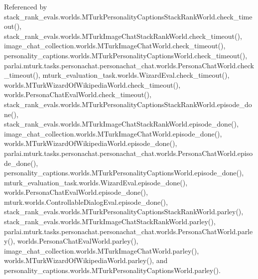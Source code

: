 Referenced by stack\+\_\+rank\+\_\+evals.\+worlds.\+M\+Turk\+Personality\+Captions\+Stack\+Rank\+World.\+check\+\_\+timeout(), stack\+\_\+rank\+\_\+evals.\+worlds.\+M\+Turk\+Image\+Chat\+Stack\+Rank\+World.\+check\+\_\+timeout(), image\+\_\+chat\+\_\+collection.\+worlds.\+M\+Turk\+Image\+Chat\+World.\+check\+\_\+timeout(), personality\+\_\+captions.\+worlds.\+M\+Turk\+Personality\+Captions\+World.\+check\+\_\+timeout(), parlai.\+mturk.\+tasks.\+personachat.\+personachat\+\_\+chat.\+worlds.\+Persona\+Chat\+World.\+check\+\_\+timeout(), mturk\+\_\+evaluation\+\_\+task.\+worlds.\+Wizard\+Eval.\+check\+\_\+timeout(), worlds.\+M\+Turk\+Wizard\+Of\+Wikipedia\+World.\+check\+\_\+timeout(), worlds.\+Persona\+Chat\+Eval\+World.\+check\+\_\+timeout(), stack\+\_\+rank\+\_\+evals.\+worlds.\+M\+Turk\+Personality\+Captions\+Stack\+Rank\+World.\+episode\+\_\+done(), stack\+\_\+rank\+\_\+evals.\+worlds.\+M\+Turk\+Image\+Chat\+Stack\+Rank\+World.\+episode\+\_\+done(), image\+\_\+chat\+\_\+collection.\+worlds.\+M\+Turk\+Image\+Chat\+World.\+episode\+\_\+done(), worlds.\+M\+Turk\+Wizard\+Of\+Wikipedia\+World.\+episode\+\_\+done(), parlai.\+mturk.\+tasks.\+personachat.\+personachat\+\_\+chat.\+worlds.\+Persona\+Chat\+World.\+episode\+\_\+done(), personality\+\_\+captions.\+worlds.\+M\+Turk\+Personality\+Captions\+World.\+episode\+\_\+done(), mturk\+\_\+evaluation\+\_\+task.\+worlds.\+Wizard\+Eval.\+episode\+\_\+done(), worlds.\+Persona\+Chat\+Eval\+World.\+episode\+\_\+done(), mturk.\+worlds.\+Controllable\+Dialog\+Eval.\+episode\+\_\+done(), stack\+\_\+rank\+\_\+evals.\+worlds.\+M\+Turk\+Personality\+Captions\+Stack\+Rank\+World.\+parley(), stack\+\_\+rank\+\_\+evals.\+worlds.\+M\+Turk\+Image\+Chat\+Stack\+Rank\+World.\+parley(), parlai.\+mturk.\+tasks.\+personachat.\+personachat\+\_\+chat.\+worlds.\+Persona\+Chat\+World.\+parley(), worlds.\+Persona\+Chat\+Eval\+World.\+parley(), image\+\_\+chat\+\_\+collection.\+worlds.\+M\+Turk\+Image\+Chat\+World.\+parley(), worlds.\+M\+Turk\+Wizard\+Of\+Wikipedia\+World.\+parley(), and personality\+\_\+captions.\+worlds.\+M\+Turk\+Personality\+Captions\+World.\+parley().

\mbox{\label{classimage__chat__collection_1_1worlds_1_1MTurkImageChatWorld_a83ee57ee0709f14bee6e64cef39ab17d}} 
